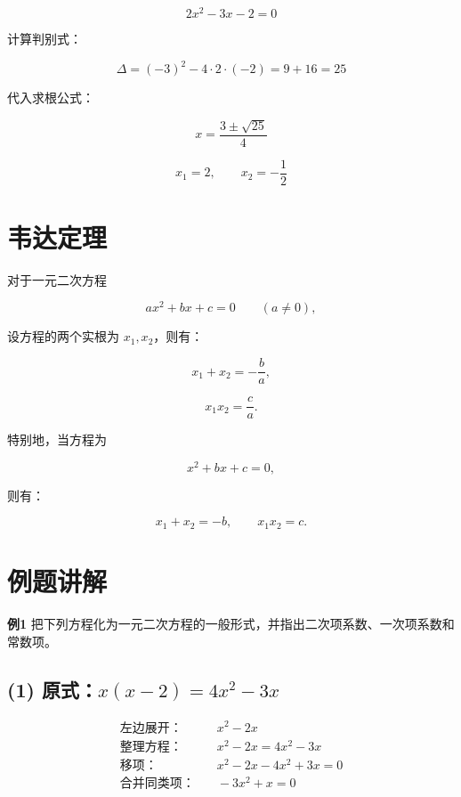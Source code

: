 \documentclass[12pt]{article}
\begin{document}
\[
  2x^2 - 3x - 2 = 0
\]



计算判别式：


\[
  \Delta = (-3)^2 - 4 \cdot 2 \cdot (-2) = 9 + 16 = 25
\]



代入求根公式：


\[
  x = \frac{3 \pm \sqrt{25}}{4}
\]




\[
  x_1 = 2,\qquad x_2 = -\frac{1}{2}
\]

\section{韦达定理}

对于一元二次方程


\[
  ax^2 + bx + c = 0 \qquad (a \neq 0),
\]


设方程的两个实根为 \(x_1, x_2\)，则有：



\[
  x_1 + x_2 = -\frac{b}{a},
\]




\[
  x_1 x_2 = \frac{c}{a}.
\]



特别地，当方程为


\[
  x^2 + bx + c = 0,
\]


则有：


\[
  x_1 + x_2 = -b,\qquad x_1 x_2 = c.
\]



\section*{例题讲解}

\textbf{例1} 把下列方程化为一元二次方程的一般形式，并指出二次项系数、一次项系数和常数项。

\subsection*{(1) 原式：\quad \( x(x - 2) = 4x^2 - 3x \)}

\begin{align*}
  \text{左边展开：}  & \quad x^2 - 2x                 \\
  \text{整理方程：}  & \quad x^2 - 2x = 4x^2 - 3x     \\
  \text{移项：}    & \quad x^2 - 2x - 4x^2 + 3x = 0 \\
  \text{合并同类项：} & \quad -3x^2 + x = 0
\end{align*}
\end{document}
